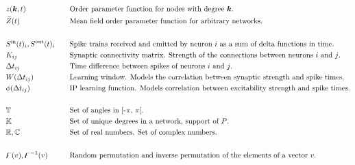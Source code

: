 \begin{alignat*}{2}
& z({\boldsymbol{k}}, t) &&\text{Order parameter function for nodes with degree ${\boldsymbol{k}}$.}\\
& \bar{Z}(t) &&\text{Mean field order parameter function for arbitrary networks.}\\ \\
& {S^{\rm in}}(t)_i, {S^{\rm out}}(t)_i \quad &&\text{Spike trains received and emitted by neuron $i$ as a sum of delta functions in time.}\\ 
& K_{ij} &&\text{Synaptic connectivity matrix. Strength of the connections between neurons $i$ and $j$.}\\
& \Delta t_{ij} &&\text{Time difference between spikes of neurons $i$ and $j$.}\\
& W(\Delta t_{ij}) &&\text{Learning window. Models the correlation between synaptic strength and spike times.}\\ 
& \phi(\Delta t_{ij}) &&\text{IP learning function. Models correlation between excitability strength and spike times.}\\ \\
& {\mathbb{T}} &&\text{Set of angles in [-$\pi$, $\pi$[.}\\
& {\mathbb{K}} &&\text{Set of unique degrees in a network, support of $P$.}\\ 
& {\mathbb{R}}, {\mathbb{C}} &&\text{Set of real numbers. Set of complex numbers.}\\ \\
& {\digamma}(v), {\digamma^{-1}}(v) &&\text{Random permutation and inverse permutation of the elements of a vector $v$.}\\ 
\end{alignat*}
